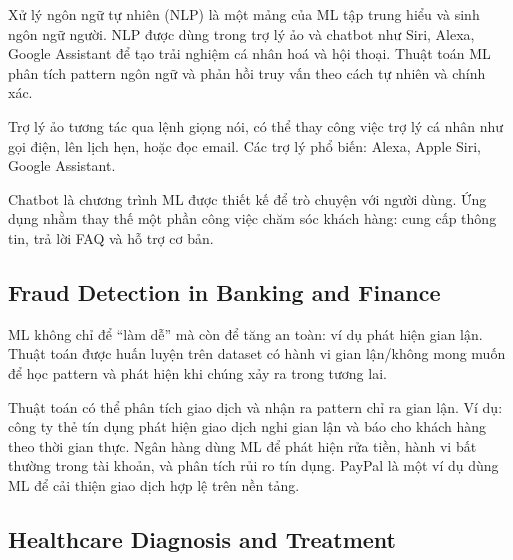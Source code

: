 \begin{dongco}[title={NLP và trải nghiệm hội thoại}]
Xử lý ngôn ngữ tự nhiên (NLP) là một mảng của ML tập trung hiểu và sinh ngôn ngữ người.
NLP được dùng trong trợ lý ảo và chatbot như Siri, Alexa, Google Assistant để tạo trải nghiệm cá nhân hoá và hội thoại.
Thuật toán ML phân tích pattern ngôn ngữ và phản hồi truy vấn theo cách tự nhiên và chính xác.
\end{dongco}

\begin{ynghia}[title={Virtual assistants}]
Trợ lý ảo tương tác qua lệnh giọng nói, có thể thay công việc trợ lý cá nhân như gọi điện, lên lịch hẹn, hoặc đọc email.
Các trợ lý phổ biến: Alexa, Apple Siri, Google Assistant.
\end{ynghia}

\begin{ynghia}[title={Chatbots}]
Chatbot là chương trình ML được thiết kế để trò chuyện với người dùng.
Ứng dụng nhằm thay thế một phần công việc chăm sóc khách hàng: cung cấp thông tin, trả lời FAQ và hỗ trợ cơ bản.
\end{ynghia}

\subsection{Fraud Detection in Banking and Finance}

\begin{dongco}[title={ML cho an toàn và bảo mật}]
ML không chỉ để “làm dễ” mà còn để tăng an toàn: ví dụ phát hiện gian lận.
Thuật toán được huấn luyện trên dataset có hành vi gian lận/không mong muốn để học pattern và phát hiện khi chúng xảy ra trong tương lai.
\end{dongco}

\begin{ynghia}[title={Ví dụ thực tế}]
Thuật toán có thể phân tích giao dịch và nhận ra pattern chỉ ra gian lận.
Ví dụ: công ty thẻ tín dụng phát hiện giao dịch nghi gian lận và báo cho khách hàng theo thời gian thực.
Ngân hàng dùng ML để phát hiện rửa tiền, hành vi bất thường trong tài khoản, và phân tích rủi ro tín dụng.
PayPal là một ví dụ dùng ML để cải thiện giao dịch hợp lệ trên nền tảng.
\end{ynghia}

\subsection{Healthcare Diagnosis and Treatment}

